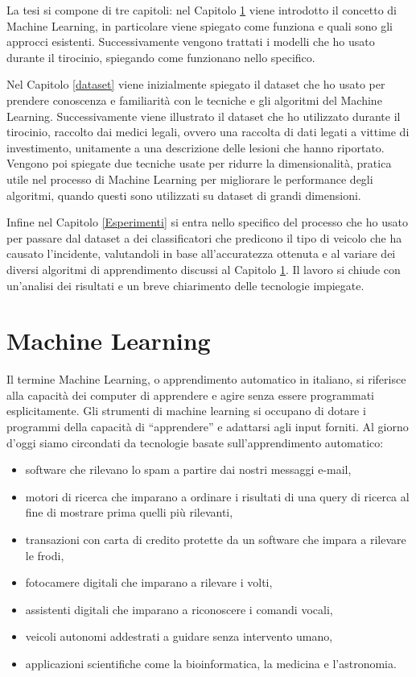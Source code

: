 \documentclass[12pt,italian]{report}
\begin{document}
La tesi si compone di tre capitoli: nel Capitolo \ref{machinelearning} viene introdotto il concetto di Machine Learning, in particolare viene spiegato come funziona e quali sono gli approcci esistenti. Successivamente vengono trattati i modelli che ho usato durante il tirocinio, spiegando come funzionano nello specifico.

Nel Capitolo \ref{dataset} viene inizialmente spiegato il dataset che ho usato per prendere conoscenza e familiarità con le tecniche e gli algoritmi del Machine Learning. Successivamente viene illustrato il dataset che ho utilizzato durante il tirocinio, raccolto dai medici legali, ovvero una raccolta di dati legati a vittime di investimento, unitamente a una descrizione delle lesioni che hanno riportato. Vengono poi spiegate due tecniche usate per ridurre la dimensionalità, pratica utile nel processo di Machine Learning per migliorare le performance degli algoritmi, quando questi sono utilizzati su dataset di grandi dimensioni.

Infine nel Capitolo \ref{Esperimenti} si entra nello specifico del processo che ho usato per passare dal dataset a dei classificatori che predicono il tipo di veicolo che ha causato l'incidente, valutandoli in base all'accuratezza ottenuta e al variare dei diversi algoritmi di apprendimento discussi al Capitolo \ref{machinelearning}. Il lavoro si chiude con un'analisi dei risultati e un breve chiarimento delle tecnologie impiegate.




\chapter{Machine Learning}
\label{machinelearning}
Il termine Machine Learning, o apprendimento automatico in italiano, si riferisce alla capacità dei computer di apprendere e agire senza essere programmati esplicitamente.
Gli strumenti di machine learning si occupano di dotare i programmi della capacità di ``apprendere'' e adattarsi agli input forniti.
Al giorno d'oggi siamo circondati da tecnologie basate sull'apprendimento automatico:
\begin{itemize}
	\item software che rilevano lo spam a partire dai nostri messaggi e-mail, 
	\item motori di ricerca che imparano a ordinare i risultati di una query di ricerca al fine di mostrare prima quelli più rilevanti, 
	\item transazioni con carta di credito protette da un software che impara a rilevare le frodi, 
	\item fotocamere digitali che imparano a rilevare i volti, 
	\item assistenti digitali che imparano a riconoscere i comandi vocali, 
	\item veicoli autonomi addestrati a guidare senza intervento umano, 
	\item applicazioni scientifiche come la bioinformatica, la medicina e l'astronomia.
\end{itemize}
\end{document}

